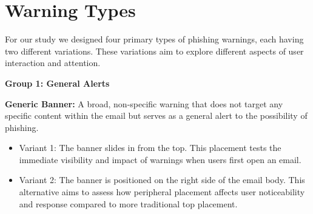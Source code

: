 \documentclass[
  a4paper,  %
  twoside,  %
  bibliography=totoc,
  headsepline,
  cleardoublepage=empty,
  parskip=half,
  draft=false
]{scrbook}
\begin{document}
\section{Warning Types}
\label{types}
For our study we designed four primary types of phishing warnings, each having two different variations. These variations aim to explore different aspects of user interaction and attention.

\textbf{Group 1: General Alerts}

\textbf{Generic Banner:} A broad, non-specific warning that does not target any specific content within the email but serves as a general alert to the possibility of phishing.

\begin{itemize}
    \item Variant 1: The banner slides in from the top. This placement tests the immediate visibility and impact of warnings when users first open an email. 
    \item Variant 2: The banner is positioned on the right side of the email body. This alternative aims to assess how peripheral placement affects user noticeability and response compared to more traditional top placement.\par
\end{itemize}
\end{document}

